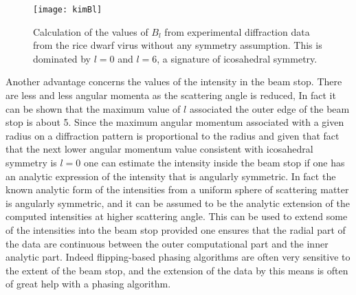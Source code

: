 \begin{figure}[ht]
  \centering
  \texttt{[image: kimBl]}
\caption{
Calculation of the values of $B_l$ from experimental diffraction data from the rice dwarf virus without any symmetry assumption. This is dominated by $l=0$ and $l=6$,  a signature of icosahedral symmetry.
}
\label{fig:kimBl}
\end{figure}

Another advantage concerns the values of the intensity in the beam stop. There are less and less angular momenta as the scattering angle is reduced, In fact it can be shown that the maximum value of $l$ associated the outer edge of the beam stop is about 5. Since the maximum angular momentum associated with a given radius on a diffraction pattern is proportional to the radius and given that fact that the next lower angular momentum value consistent with icosahedral symmetry is $l=0$ one can estimate the intensity inside the beam stop if one has an analytic expression of the intensity that is angularly symmetric. In fact the known analytic form of the intensities from a uniform sphere of scattering matter is angularly symmetric, and it can be assumed to be the analytic extension of the computed intensities at higher scattering angle. This can be used to extend some of the intensities into the beam stop provided one ensures that the radial part of the data are continuous between the outer computational part and the inner analytic part. Indeed flipping-based phasing algorithms \cite{oszlanyi2004,oszlanyi2005} are often  very sensitive to the extent of the beam stop, and the extension of the data by this means is often of great help with a phasing algorithm.


